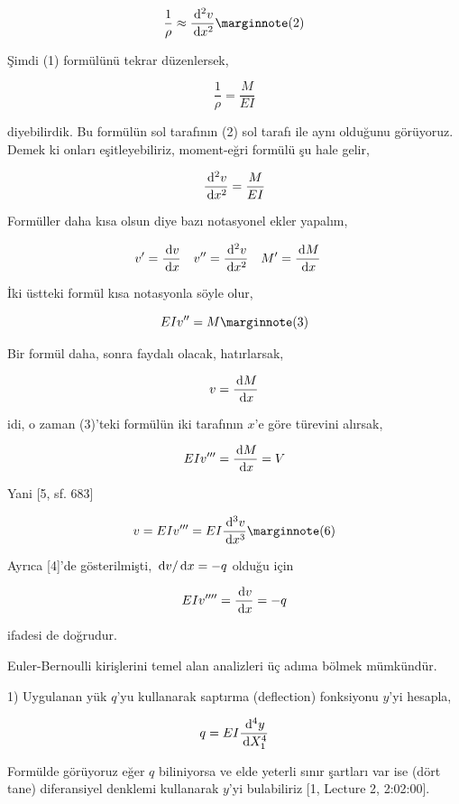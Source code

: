 \documentclass[12pt,fleqn]{article}\usepackage{../../common}
\begin{document}
$$
\frac{1}{\rho} \approx \frac{\ud^2 v}{\ud x^2}
\mlabel{2}
$$

Şimdi (1) formülünü tekrar düzenlersek,

$$
\frac{1}{\rho} = \frac{M}{EI }
$$

diyebilirdik. Bu formülün sol tarafının (2) sol tarafı ile aynı olduğunu
görüyoruz. Demek ki onları eşitleyebiliriz, moment-eğri formülü şu hale gelir,

$$
\frac{\,\mathrm{d}^2 v}{\,\mathrm{d} x^2} = \frac{M}{E I}
$$

Formüller daha kısa olsun diye bazı notasyonel ekler yapalım,

$$
v' = \frac{\,\mathrm{d} v}{\,\mathrm{d} x} \quad 
v'' = \frac{\,\mathrm{d}^2 v}{\,\mathrm{d} x^2} \quad 
M' = \frac{\,\mathrm{d} M}{\,\mathrm{d} x} \quad 
$$

İki üstteki formül kısa notasyonla söyle olur,

$$
EI v'' = M
\mlabel{3}
$$

Bir formül daha, sonra faydalı olacak, hatırlarsak,

$$
v = \frac{\,\mathrm{d} M}{\,\mathrm{d} x}
$$

idi, o zaman (3)'teki formülün iki tarafının $x$'e göre türevini alırsak,

$$
EI v''' = \frac{\,\mathrm{d} M}{\,\mathrm{d} x} = V
$$

Yani [5, sf. 683]

$$
v = EI v''' = EI \frac{\ud^3 v}{\ud x^3}
\mlabel{6}
$$

Ayrıca [4]'de gösterilmişti, $\,\mathrm{d} v / \,\mathrm{d} x = -q$ olduğu için

$$
EI v'''' = \frac{\,\mathrm{d} v}{\,\mathrm{d} x} = -q
$$

ifadesi de doğrudur.




















Euler-Bernoulli kirişlerini temel alan analizleri üç adıma bölmek mümkündür.

1) Uygulanan yük $q$'yu kullanarak saptırma (deflection) fonksiyonu $y$'yi hesapla,

$$
q = E I \frac{\,\mathrm{d}^4 y}{\,\mathrm{d} X_1^4}
$$

Formülde görüyoruz eğer $q$ biliniyorsa ve elde yeterli sınır şartları var ise
(dört tane) diferansiyel denklemi kullanarak $y$'yi bulabiliriz
[1, Lecture 2, 2:02:00]. 
\end{document}
